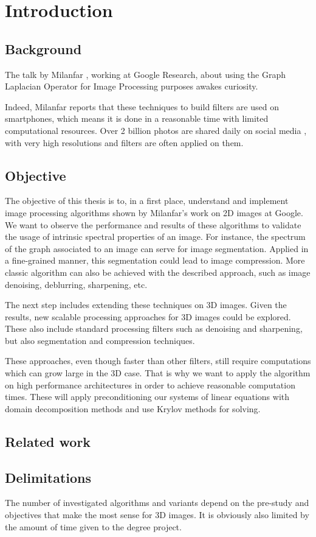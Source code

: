 \chapter{Introduction}

\section{Background}

The talk by Milanfar \cite{siam_slides_2016}, working at Google Research, about using the Graph Laplacian Operator for Image Processing purposes awakes curiosity.

Indeed, Milanfar reports that these techniques to build filters are used on smartphones, which means it is done in a reasonable time with limited computational resources.
Over 2 billion photos are shared daily on social media \cite{siam_slides_2016}, with very high resolutions and filters are often applied on them.


\section{Objective}

The objective of this thesis is to, in a first place, understand and implement image processing algorithms shown by Milanfar's work on 2D images at Google.
We want to observe the performance and results of these algorithms to validate the usage of intrinsic spectral properties of an image.
For instance, the spectrum of the graph associated to an image can serve for image segmentation.
Applied in a fine-grained manner, this segmentation could lead to image compression.
More classic algorithm can also be achieved with the described approach, such as image denoising, deblurring, sharpening, etc.

The next step includes extending these techniques on 3D images.
Given the results, new scalable processing approaches for 3D images could be explored.
These also include standard processing filters such as denoising and sharpening, but also segmentation and compression techniques.

These approaches, even though faster than other filters, still require computations which can grow large in the 3D case.
That is why we want to apply the algorithm on high performance architectures in order to achieve reasonable computation times.
These will apply preconditioning our systems of linear equations with domain decomposition methods and use Krylov methods for solving.

\section{Related work}



\section{Delimitations}

The number of investigated algorithms and variants depend on the pre-study and objectives that make the most sense for 3D images.
It is obviously also limited by the amount of time given to the degree project.
